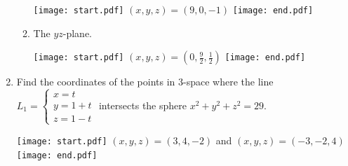 \documentclass[12pt]{article}
\begin{document}
\begin{enumerate}
\begin{enumerate}
\texttt{[image: start.pdf]}
{{$(x,y,z)=(9,0,-1)$}}
\texttt{[image: end.pdf]}


\item The $yz$-plane.

\texttt{[image: start.pdf]}
{{$(x,y,z)=\left(0,\frac{9}{2},\frac{1}{2}\right)$}}
\texttt{[image: end.pdf]}


\end{enumerate}

\item Find the coordinates of the points in 3-space where the line $L_1=\left\{\begin{array}{l}
x=t\\y=1+t\\
z=1-t\end{array}\right.$ intersects the sphere $x^2+y^2+z^2=29$.

\texttt{[image: start.pdf]}
{{$(x,y,z)=(3,4,-2)$ and $(x,y,z)=(-3,-2,4)$}}
\texttt{[image: end.pdf]}


\end{enumerate}

\end{document}
